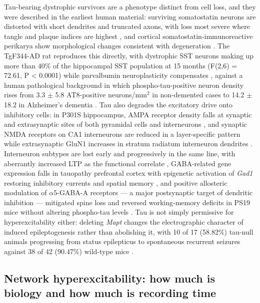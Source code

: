 \documentclass[11pt]{article}
\begin{document}
Tau-bearing dystrophic survivors are a phenotype distinct from cell loss, and they were described in the earliest human material: surviving somatostatin neurons are distorted with short dendrites and truncated axons, with loss most severe where tangle and plaque indices are highest \citep{ChanPalay1987}, and cortical somatostatin-immunoreactive perikarya show morphological changes consistent with degeneration \citep{Roberts1985}. The TgF344-AD rat reproduces this directly, with dystrophic SST neurons making up more than 40\% of the hippocampal SST population at 15 months (F(2,6) = 72.61, P < 0.0001) while parvalbumin neuroplasticity compensates \citep{Morrone2022}, against a human pathological background in which phospho-tau-positive neuron density rises from 3.3 $\pm$ 5.8 AT8-positive neurons/mm$^{2}$ in non-demented cases to 14.2 $\pm$ 18.2 in Alzheimer's dementia \citep{MerinoSerrais2025}. Tau also degrades the excitatory drive onto inhibitory cells: in P301S hippocampus, AMPA receptor density falls at synaptic and extrasynaptic sites of both pyramidal cells and interneurons \citep{AlfaroRuiz2022b}, and synaptic NMDA receptors on CA1 interneurons are reduced in a layer-specific pattern while extrasynaptic GluN1 increases in stratum radiatum interneuron dendrites \citep{AlfaroRuiz2022a}. Interneuron subtypes are lost early and progressively in the same line, with aberrantly increased LTP as the functional correlate \citep{Bold2022}, GABA-related gene expression falls in tauopathy prefrontal cortex with epigenetic activation of \emph{Gad1} restoring inhibitory currents and spatial memory \citep{Wan2025}, and positive allosteric modulation of $\alpha$5-GABA-A receptors --- a major postsynaptic target of dendritic inhibition --- mitigated spine loss and reversed working-memory deficits in PS19 mice without altering phospho-tau levels \citep{Dharavath2024}. Tau is not simply permissive for hyperexcitability either: deleting \emph{Mapt} changes the electrographic character of induced epileptogenesis rather than abolishing it, with 10 of 17 (58.82\%) tau-null animals progressing from status epilepticus to spontaneous recurrent seizures against 38 of 42 (90.47\%) wild-type mice \citep{Moseley2025}.

\subsection{Network hyperexcitability: how much is biology and how much is recording time}
\label{sec-04-hyperexcitability}
\end{document}

